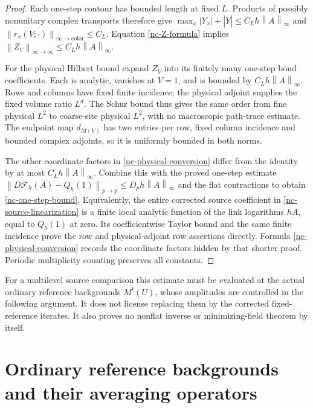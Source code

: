 \documentclass[11pt]{article}
\theoremstyle{remark}
\newcommand{\norm}[1]{\left\|#1\right\|}
\begin{document}
\begin{proof}
Each one-step contour has bounded length at fixed $L$. Products of
possibly nonunitary complex transports therefore give
$\max_x|Y_x|+|\overline Y|\le C_Lh\norm{A}_\infty$ and
$\norm{r_x(V;\cdot)}_{\infty\to\mathrm{color}}\le C_L$.
Equation \eqref{nc-Z-formula} implies
$\norm{Z_V}_{\infty\to\infty}\le C_Lh\norm{A}_\infty$.

For the physical Hilbert bound expand $Z_V$ into its finitely many
one-step bond coefficients. Each is analytic, vanishes at $V=1$,
and is bounded by $C_Lh\norm{A}_\infty$. Rows and columns have
fixed finite incidence; the physical adjoint supplies the fixed
volume ratio $L^d$. The Schur bound thus gives the same order
from fine physical $L^2$ to coarse-site physical $L^2$, with no
macroscopic path-trace estimate. The endpoint map $d_{M(V)}$ has
two entries per row, fixed column incidence and bounded complex
adjoints, so it is uniformly bounded in both norms.

The other coordinate factors in \eqref{nc-physical-conversion}
differ from the identity by at most $C_Lh\norm{A}_\infty$.
Combine this with the proved one-step estimate
$\norm{D\mathcal F_h(A)-Q_h(1)}_{p\to p}
\le D_ph\norm{A}_\infty$ and the flat contractions to obtain
\eqref{nc-one-step-bound}. Equivalently, the entire corrected
source coefficient in \eqref{nc-source-linearization} is a finite
local analytic function of the link logarithms $hA$, equal to
$Q_h(1)$ at zero. Its coefficientwise Taylor bound and the same
finite incidence prove the row and physical-adjoint row assertions
directly. Formula \eqref{nc-physical-conversion} records the
coordinate factors hidden by that shorter proof. Periodic
multiplicity counting preserves all constants.
\end{proof}

For a multilevel source comparison this estimate must be evaluated
at the actual ordinary reference backgrounds $M^t(U)$, whose
amplitudes are controlled in the following argument. It does not
license replacing them by the corrected fixed-reference iterates.
It also proves no nonflat inverse or minimizing-field theorem by
itself.


\section{Ordinary reference backgrounds and their averaging operators}
\label{nb-section}
\end{document}
